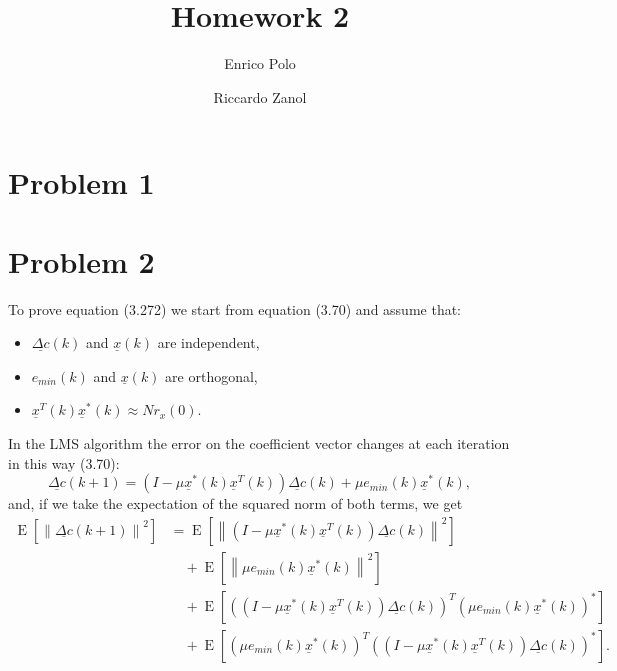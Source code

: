 \documentclass{article}
\author{Enrico Polo \and Riccardo Zanol}
\title{Homework 2}
\renewcommand{\vec}[1]{\underline{#1}}
\newcommand{\E}[1]{\operatorname{E}\left[#1\right]}
\newcommand{\norm}[1]{\left\lVert#1\right\rVert}
\begin{document}
\maketitle
\section*{Problem 1}
\section*{Problem 2}
To prove equation (3.272) we start from equation (3.70) and assume that:
\begin{itemize}
\item $\vec{\Delta c}(k)$ and $\vec{x}(k)$ are independent, 
\item $e_{min}(k)$ and $\vec{x}(k)$ are orthogonal, 
\item $\vec{x}^T(k)\vec{x}^*(k) \approx Nr_x(0)$.
\end{itemize}
In the LMS algorithm the error on the coefficient vector changes at each iteration in this way (3.70):
\begin{equation*}
  \vec{\Delta c}(k+1) = \left( I - \mu\vec{x}^*(k)\vec{x}^T(k) \right) \vec{\Delta c}(k) + \mu e_{min}(k)\vec{x}^*(k) , 
\end{equation*}
and, if we take the expectation of the squared norm of both terms, we get
\begin{align}
  \E{\norm{\vec{\Delta c}(k+1)}^2} %
  &= \E{\norm{\left( I - \mu\vec{x}^*(k)\vec{x}^T(k) \right) \vec{\Delta c}(k)}^2}
  \label{eq:exp_1} \\
  & \quad + \E{\norm{\mu e_{min}(k)\vec{x}^*(k)}^2}
  \label{eq:exp_2} \\
  & \quad + \E{\left(\left( I - \mu\vec{x}^*(k)\vec{x}^T(k) \right)\vec{\Delta c}(k)\right)^T\left(\mu e_{min}(k)\vec{x}^*(k)\right)^*}
  \label{eq:exp_3} \\
  & \quad + \E{\left(\mu e_{min}(k)\vec{x}^*(k)\right)^T\left(\left( I - \mu\vec{x}^*(k) \vec{x}^T(k)\right) \vec{\Delta c}(k)\right)^*}
  \label{eq:exp_4} .
\end{align}
\end{document}
